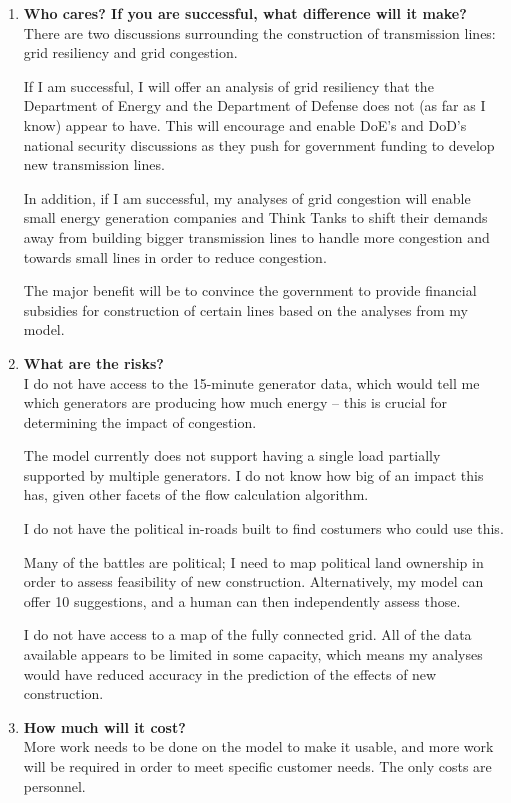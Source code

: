 \documentclass{article}
\begin{document}
\begin{enumerate}
  \item
  \textbf{Who cares? If you are successful, what difference will it make?} \\
  There are two discussions surrounding the construction of transmission lines:
  grid resiliency and grid congestion.

  If I am successful, I will offer an analysis of grid resiliency that the
  Department of Energy and the Department of Defense does not (as far as I know)
  appear to have. This will encourage and enable DoE's and DoD's national
  security discussions as they push for government funding to develop new
  transmission lines.

  In addition, if I am successful, my analyses of grid congestion will enable
  small energy generation companies and Think Tanks to shift their demands
  away from building bigger transmission lines to handle more congestion and
  towards small lines in order to reduce congestion.

  The major benefit will be to convince the government to provide financial
  subsidies for construction of certain lines based on the analyses from my
  model.

  \item
  \textbf{What are the risks?} \\
  I do not have access to the 15-minute generator data, which would tell me
  which generators are producing how much energy -- this is crucial for
  determining the impact of congestion.

  The model currently does not support having a single load partially supported
  by multiple generators. I do not know how big of an impact this has, given
  other facets of the flow calculation algorithm.

  I do not have the political in-roads built to find costumers who could use
  this.

  Many of the battles are political; I need to map political land ownership in
  order to assess feasibility of new construction. Alternatively, my model can
  offer 10 suggestions, and a human can then independently assess those.

  I do not have access to a map of the fully connected grid. All of the data
  available appears to be limited in some capacity, which means my analyses
  would have reduced accuracy in the prediction of the effects of new
  construction.

  \item
  \textbf{How much will it cost?} \\
  More work needs to be done on the model to make it usable, and more work will
  be required in order to meet specific customer needs. The only costs are
  personnel.


\end{enumerate}
\end{document}
